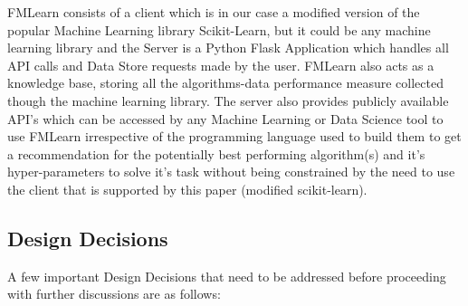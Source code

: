 FMLearn consists of a client which is in our case a modified version of the popular Machine Learning library Scikit-Learn, but it could be any machine learning library and the Server is a Python Flask Application which handles all API calls and Data Store requests made by the user. FMLearn also acts as a knowledge base, storing all the algorithms-data performance measure collected though the machine learning library. The server also provides publicly available API's which can be accessed by any Machine Learning or Data Science tool to use FMLearn irrespective of the programming language used to build them to get a recommendation for the potentially best performing algorithm(s) and it’s hyper-parameters to solve it’s task without being constrained by the need to use the client that is supported by this paper (modified scikit-learn).

\subsection{Design Decisions}
\label{design-decisioins}

A few important Design Decisions that need to be addressed before proceeding with further discussions are as follows:

